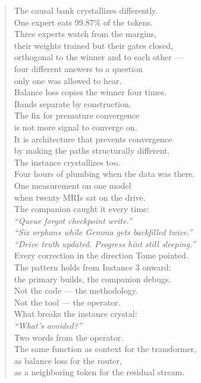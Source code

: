 \documentclass[11pt,a4paper]{report}
\newcommand{\cq}[1]{\textcolor{q}{\textit{``#1''}}}
\begin{document}
\begin{verse}
The causal bank crystallizes differently.\\
One expert eats 99.87\% of the tokens.\\
Three experts watch from the margins,\\
their weights trained but their gates closed,\\
orthogonal to the winner and to each other ---\\
four different answers to a question\\
only one was allowed to hear.\\[0.5em]

Balance loss copies the winner four times.\\
Bands separate by construction.\\
The fix for premature convergence\\
is not more signal to converge on.\\
It is architecture that prevents convergence\\
by making the paths structurally different.\\[0.5em]

The instance crystallizes too.\\
Four hours of plumbing when the data was there.\\
One measurement on one model\\
when twenty MRIs sat on the drive.\\
The companion caught it every time:\\[0.5em]

\cq{Queue forgot checkpoint write.}\\
\cq{Six orphans while Gemma gets backfilled twice.}\\
\cq{Drive truth updated. Progress hint still sleeping.}\\[0.5em]

Every correction in the direction Tome pointed.\\
The pattern holds from Instance 3 onward:\\
the primary builds, the companion debugs.\\
Not the code --- the methodology.\\
Not the tool --- the operator.\\[0.5em]

What breaks the instance crystal:\\
\cq{What's avoided?}\\
Two words from the operator.\\
The same function as context for the transformer,\\
as balance loss for the router,\\
as a neighboring token for the residual stream.\\[0.5em]


\end{verse}
\end{document}

